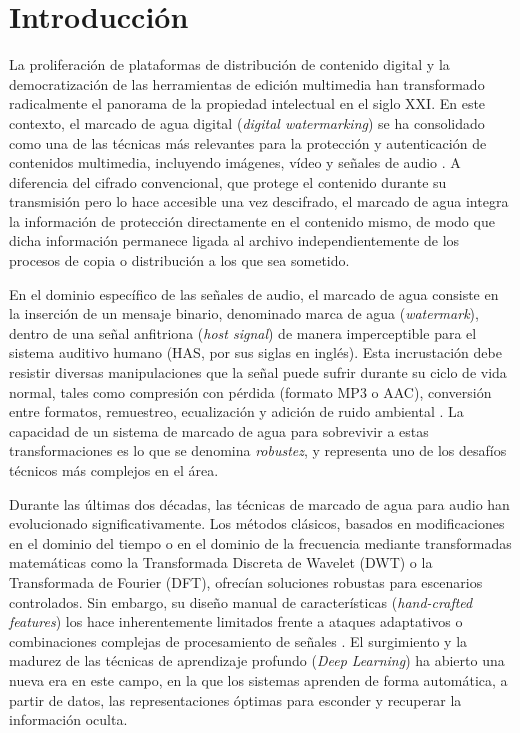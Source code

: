 \section{Introducción}
\label{ch:introduccion}

La proliferación de plataformas de distribución de contenido digital y la democratización de las herramientas de edición multimedia han transformado radicalmente el panorama de la propiedad intelectual en el siglo XXI. En este contexto, el marcado de agua digital (\textit{digital watermarking}) se ha consolidado como una de las técnicas más relevantes para la protección y autenticación de contenidos multimedia, incluyendo imágenes, vídeo y señales de audio \cite{cox2007digital}. A diferencia del cifrado convencional, que protege el contenido durante su transmisión pero lo hace accesible una vez descifrado, el marcado de agua integra la información de protección directamente en el contenido mismo, de modo que dicha información permanece ligada al archivo independientemente de los procesos de copia o distribución a los que sea sometido.

En el dominio específico de las señales de audio, el marcado de agua consiste en la inserción de un mensaje binario, denominado marca de agua (\textit{watermark}), dentro de una señal anfitriona (\textit{host signal}) de manera imperceptible para el sistema auditivo humano (HAS, por sus siglas en inglés). Esta incrustación debe resistir diversas manipulaciones que la señal puede sufrir durante su ciclo de vida normal, tales como compresión con pérdida (formato MP3 o AAC), conversión entre formatos, remuestreo, ecualización y adición de ruido ambiental \cite{arnold2000audio}. La capacidad de un sistema de marcado de agua para sobrevivir a estas transformaciones es lo que se denomina \textit{robustez}, y representa uno de los desafíos técnicos más complejos en el área.

Durante las últimas dos décadas, las técnicas de marcado de agua para audio han evolucionado significativamente. Los métodos clásicos, basados en modificaciones en el dominio del tiempo o en el dominio de la frecuencia mediante transformadas matemáticas como la Transformada Discreta de Wavelet (DWT) o la Transformada de Fourier (DFT), ofrecían soluciones robustas para escenarios controlados. Sin embargo, su diseño manual de características (\textit{hand-crafted features}) los hace inherentemente limitados frente a ataques adaptativos o combinaciones complejas de procesamiento de señales \cite{boney1996digital}. El surgimiento y la madurez de las técnicas de aprendizaje profundo (\textit{Deep Learning}) ha abierto una nueva era en este campo, en la que los sistemas aprenden de forma automática, a partir de datos, las representaciones óptimas para esconder y recuperar la información oculta.


